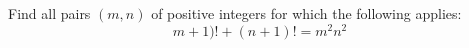 Find all pairs $(m,n)$ of positive integers for which the following applies:
$$m+1)! + (n+1)! = m^2n^2$$